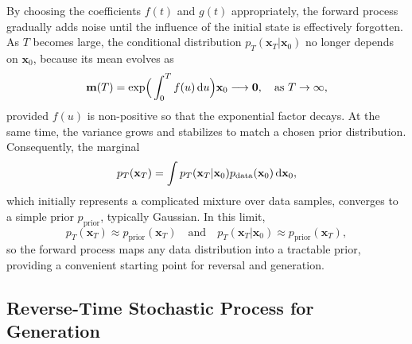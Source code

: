 By choosing the coefficients $f(t)$ and $g(t)$ appropriately, the forward process gradually adds noise until the influence of the initial state is effectively forgotten. As $T$ becomes large, the conditional distribution $p_T(\mathbf{x}_T |\mathbf{x}_0)$ no longer depends on $\mathbf{x}_0$, because its mean evolves as
\[
{\mathbf{m}}(T) = \exp\!\Big(\int_0^T f(u)\mathop{}\!\mathrm{d} u\Big) \mathbf{x}_0  \longrightarrow  \mathbf{0}, \quad \text{as } T\to\infty,
\]
provided $f(u)$ is non-positive so that the exponential factor decays. At the same time, the variance grows and stabilizes to match a chosen prior distribution. Consequently, the marginal
\[
p_T(\mathbf{x}_T) = \int p_T(\mathbf{x}_T |\mathbf{x}_0) p_{\mathrm{data}}(\mathbf{x}_0)\mathop{}\!\mathrm{d}\mathbf{x}_0,
\]
which initially represents a complicated mixture over data samples, converges to a simple prior $p_{\mathrm{prior}}$, typically Gaussian. In this limit,
\[
p_T(\mathbf{x}_T) \approx p_{\mathrm{prior}}(\mathbf{x}_T) 
\quad \text{and} \quad 
p_T(\mathbf{x}_T |\mathbf{x}_0) \approx p_{\mathrm{prior}}(\mathbf{x}_T),
\]
so the forward process maps any data distribution into a tractable prior, providing a convenient starting point for reversal and generation.







\subsection{Reverse-Time Stochastic Process for Generation}\label{subsec:reverse-sde}



